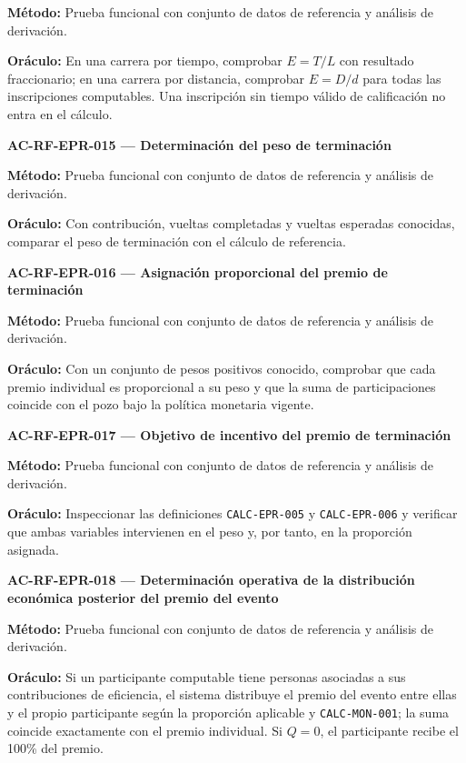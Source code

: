 \documentclass[10pt,letterpaper]{article}
\begin{document}
\textbf{Método:} Prueba funcional con conjunto de datos de referencia y análisis de derivación.\par
\textbf{Oráculo:} En una carrera por tiempo, comprobar $E=T/L$ con resultado fraccionario; en una carrera por distancia, comprobar $E=D/d$ para todas las inscripciones computables. Una inscripción sin tiempo válido de calificación no entra en el cálculo.\par\vspace{0.45em}
\noindent\textbf{AC-RF-EPR-015 --- Determinación del peso de terminación}\par
\textbf{Método:} Prueba funcional con conjunto de datos de referencia y análisis de derivación.\par
\textbf{Oráculo:} Con contribución, vueltas completadas y vueltas esperadas conocidas, comparar el peso de terminación con el cálculo de referencia.\par\vspace{0.45em}
\noindent\textbf{AC-RF-EPR-016 --- Asignación proporcional del premio de terminación}\par
\textbf{Método:} Prueba funcional con conjunto de datos de referencia y análisis de derivación.\par
\textbf{Oráculo:} Con un conjunto de pesos positivos conocido, comprobar que cada premio individual es proporcional a su peso y que la suma de participaciones coincide con el pozo bajo la política monetaria vigente.\par\vspace{0.45em}
\noindent\textbf{AC-RF-EPR-017 --- Objetivo de incentivo del premio de terminación}\par
\textbf{Método:} Prueba funcional con conjunto de datos de referencia y análisis de derivación.\par
\textbf{Oráculo:} Inspeccionar las definiciones \texttt{CALC-EPR-005} y \texttt{CALC-EPR-006} y verificar que ambas variables intervienen en el peso y, por tanto, en la proporción asignada.\par\vspace{0.45em}
\noindent\textbf{AC-RF-EPR-018 --- Determinación operativa de la distribución económica posterior del premio del evento}\par
\textbf{Método:} Prueba funcional con conjunto de datos de referencia y análisis de derivación.\par
\textbf{Oráculo:} Si un participante computable tiene personas asociadas a sus contribuciones de eficiencia, el sistema distribuye el premio del evento entre ellas y el propio participante según la proporción aplicable y \texttt{CALC-MON-001}; la suma coincide exactamente con el premio individual. Si $Q=0$, el participante recibe el 100\% del premio.\par\vspace{0.45em}
\end{document}
